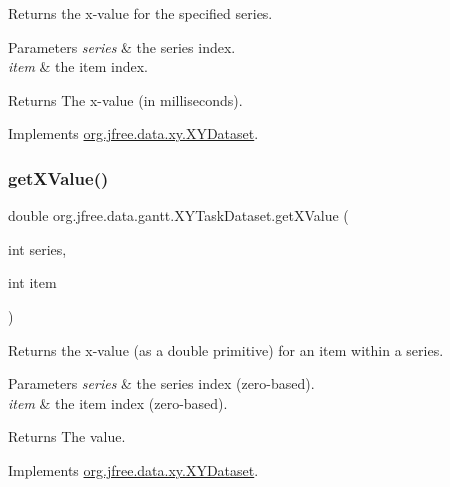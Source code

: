 Returns the x-\/value for the specified series.


\begin{DoxyParams}{Parameters}
{\em series} & the series index. \\
\hline
{\em item} & the item index.\\
\hline
\end{DoxyParams}
\begin{DoxyReturn}{Returns}
The x-\/value (in milliseconds). 
\end{DoxyReturn}


Implements \mbox{\hyperlink{interfaceorg_1_1jfree_1_1data_1_1xy_1_1_x_y_dataset_a85c75ba5b69b551e96afd29d1732ba22}{org.\+jfree.\+data.\+xy.\+X\+Y\+Dataset}}.

\mbox{\label{classorg_1_1jfree_1_1data_1_1gantt_1_1_x_y_task_dataset_aa4e0735ca3ef93d31ff25870ddead3c2}} 
\subsubsection{\texorpdfstring{get\+X\+Value()}{getXValue()}}
{\footnotesize\ttfamily double org.\+jfree.\+data.\+gantt.\+X\+Y\+Task\+Dataset.\+get\+X\+Value (\begin{DoxyParamCaption}\item[{int}]{series,  }\item[{int}]{item }\end{DoxyParamCaption})}

Returns the x-\/value (as a double primitive) for an item within a series.


\begin{DoxyParams}{Parameters}
{\em series} & the series index (zero-\/based). \\
\hline
{\em item} & the item index (zero-\/based).\\
\hline
\end{DoxyParams}
\begin{DoxyReturn}{Returns}
The value. 
\end{DoxyReturn}


Implements \mbox{\hyperlink{interfaceorg_1_1jfree_1_1data_1_1xy_1_1_x_y_dataset_a65bd212539d8f7dfb3d3d36b5f42e083}{org.\+jfree.\+data.\+xy.\+X\+Y\+Dataset}}.

